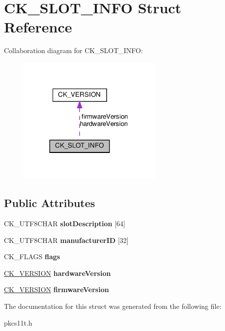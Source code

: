 \hypertarget{struct_c_k___s_l_o_t___i_n_f_o}{}\section{C\+K\+\_\+\+S\+L\+O\+T\+\_\+\+I\+N\+FO Struct Reference}
\label{struct_c_k___s_l_o_t___i_n_f_o}


Collaboration diagram for C\+K\+\_\+\+S\+L\+O\+T\+\_\+\+I\+N\+FO\+:
\nopagebreak
\begin{figure}[H]
\begin{center}
\leavevmode
\includegraphics[width=200pt]{struct_c_k___s_l_o_t___i_n_f_o__coll__graph}
\end{center}
\end{figure}
\subsection*{Public Attributes}
\begin{DoxyCompactItemize}
\item 
\mbox{\label{struct_c_k___s_l_o_t___i_n_f_o_a54a968ef99d631f025b426d32fe13648}} 
C\+K\+\_\+\+U\+T\+F8\+C\+H\+AR {\bfseries slot\+Description} \mbox{[}64\mbox{]}
\item 
\mbox{\label{struct_c_k___s_l_o_t___i_n_f_o_ab76f9ea77a8903171f203519550b89c8}} 
C\+K\+\_\+\+U\+T\+F8\+C\+H\+AR {\bfseries manufacturer\+ID} \mbox{[}32\mbox{]}
\item 
\mbox{\label{struct_c_k___s_l_o_t___i_n_f_o_a21bfc612263b8eb1d1773695872fc181}} 
C\+K\+\_\+\+F\+L\+A\+GS {\bfseries flags}
\item 
\mbox{\label{struct_c_k___s_l_o_t___i_n_f_o_aad99fb4180cd096d7ba0b9592b19445a}} 
\hyperlink{struct_c_k___v_e_r_s_i_o_n}{C\+K\+\_\+\+V\+E\+R\+S\+I\+ON} {\bfseries hardware\+Version}
\item 
\mbox{\label{struct_c_k___s_l_o_t___i_n_f_o_a32f9a9f097841afa2064c0b1a00b77fd}} 
\hyperlink{struct_c_k___v_e_r_s_i_o_n}{C\+K\+\_\+\+V\+E\+R\+S\+I\+ON} {\bfseries firmware\+Version}
\end{DoxyCompactItemize}


The documentation for this struct was generated from the following file\+:\begin{DoxyCompactItemize}
\item 
pkcs11t.\+h\end{DoxyCompactItemize}
